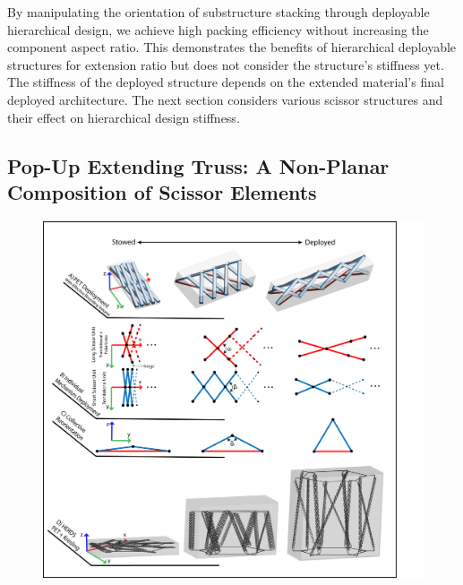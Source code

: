 By manipulating the orientation of substructure stacking through {deployable }hierarchical design, we achieve high packing efficiency without increasing the component aspect ratio. This demonstrates the benefits of hierarchical deployable structures for extension ratio but does not consider the structure's stiffness yet. The stiffness of the deployed structure depends on the extended material's final deployed architecture. The next section considers various scissor structures and their effect on hierarchical design stiffness.

\subsection{Pop-Up Extending Truss: A Non-Planar Composition of Scissor Elements}
\begin{figure}
\centering
\includegraphics[width=\textwidth]{Figures/Rebuttal/figure2_PET_reorientation_rebuttal.png}
\centering

\end{figure}
